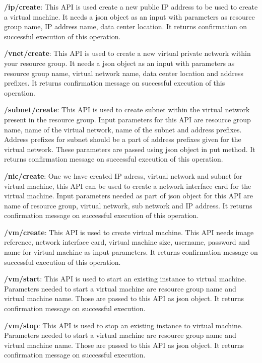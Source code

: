 \begin{description}
\item \textbf{/ip/create}: This API is used create a new public IP address to
be used to create a virtual machine. It needs a json object as an input with
parameters as resource group name, IP address name, data center location. It
returns confirmation on successful execution of this operation.

\item \textbf{/vnet/create}: This API is used to create a new virtual private
network within your resource group. It needs a json object as an input with
parameters as resource group name, virtual network name, data center location
and address prefixes. It returns confirmation message on successful execution
of this operation.

\item \textbf{/subnet/create}: This API is used to create subnet within the
virtual network present in the resource group. Input parameters for this API
are resource group name, name of the virtual network, name of the subnet and
address prefixes. Address prefixes for subnet should be a part of address
prefixes given for the virtual network. These parameters are passed using json
object in put method. It returns confirmation message on successful execution
of this operation.

\item \textbf{/nic/create}: One we have created IP adress, virtual network and
subnet for virtual machine, this API can be used to create a network interface
card for the virtual machine. Input parameters needed as part of json object
for this API are name of resource group, virtual network, sub network and IP
address. It returns confirmation message on successful execution of this
operation.

\item \textbf{/vm/create}: This API is used to create virtual machine. This
API needs image reference, network interface card, virtual machine size,
username, password and name for virtual machine as input parameters. It returns
confirmation message on successful execution of this operation.

\item \textbf{/vm/start}: This API is used to start an existing instance to
virtual machine. Parameters needed to start a virtual machine are resource
group name and virtual machine name. Those are passed to this API as json
object. It returns confirmation message on successful execution.

\item \textbf{/vm/stop}: This API is used to stop an existing instance to
virtual machine. Parameters needed to start a virtual machine are resource
group name and virtual machine name. Those are passed to this API as json
object. It returns confirmation message on successful execution.


\end{description}
